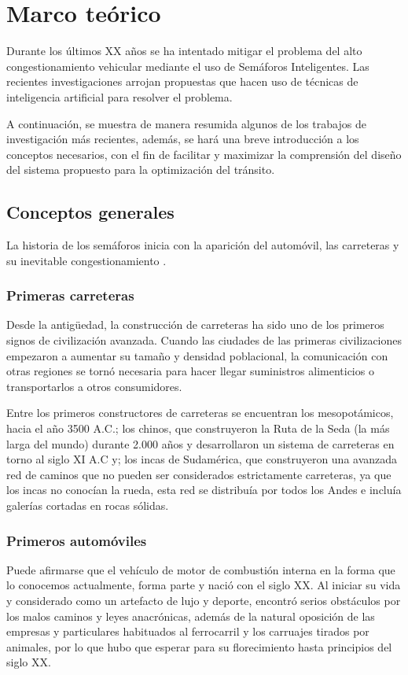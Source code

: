 \chapter{Marco teórico}

Durante los últimos XX años se ha intentado mitigar el problema del alto congestionamiento vehicular mediante el uso de Semáforos Inteligentes. Las recientes investigaciones arrojan propuestas que hacen uso  de técnicas de inteligencia artificial para resolver el problema.

A continuación, se muestra de manera resumida algunos de los trabajos de investigación más recientes, además, se hará una breve introducción a los conceptos necesarios, con el fin de facilitar y maximizar la comprensión del diseño del sistema propuesto para la optimización del tránsito.

\section{Conceptos generales}

La historia de los semáforos inicia con la aparición del automóvil, las carreteras y su inevitable congestionamiento \cite{arandia}.

\subsection{Primeras carreteras}
Desde la antigüedad, la construcción de carreteras ha sido uno de los primeros signos de civilización avanzada. Cuando las ciudades de las primeras civilizaciones empezaron a aumentar su tamaño y densidad poblacional, la comunicación con otras regiones se tornó necesaria para hacer llegar suministros alimenticios o transportarlos a otros consumidores.

Entre los primeros constructores de carreteras se encuentran los mesopotámicos, hacia el año 3500 A.C.; los chinos, que construyeron la Ruta de la Seda (la más larga del mundo) durante 2.000 años y desarrollaron un sistema de carreteras en torno al siglo XI A.C y; los incas de Sudamérica, que construyeron una avanzada red de caminos que no pueden ser considerados estrictamente carreteras, ya que los incas no conocían la rueda, esta red se distribuía por todos los Andes e incluía galerías cortadas en rocas sólidas.

\subsection{Primeros automóviles}
Puede afirmarse que el vehículo de motor de combustión interna en la forma que lo conocemos actualmente, forma parte y nació con el siglo XX.
Al iniciar su vida y considerado como un artefacto de lujo y deporte, encontró serios obstáculos por los malos caminos y leyes anacrónicas, además de la natural oposición de las empresas y particulares habituados al ferrocarril y los carruajes tirados por animales, por lo que hubo que esperar para su florecimiento hasta principios del siglo XX.

